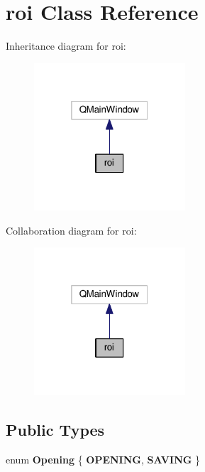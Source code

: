 \hypertarget{classroi}{}\section{roi Class Reference}
\label{classroi}


Inheritance diagram for roi\+:\nopagebreak
\begin{figure}[H]
\begin{center}
\leavevmode
\includegraphics[width=160pt]{classroi__inherit__graph}
\end{center}
\end{figure}


Collaboration diagram for roi\+:\nopagebreak
\begin{figure}[H]
\begin{center}
\leavevmode
\includegraphics[width=160pt]{classroi__coll__graph}
\end{center}
\end{figure}
\subsection*{Public Types}
\begin{DoxyCompactItemize}
\item 
enum {\bfseries Opening} \{ {\bfseries O\+P\+E\+N\+I\+NG}, 
{\bfseries S\+A\+V\+I\+NG}
 \}\hypertarget{classroi_a11ba253005bcf73bc0de2e9dddf66925}{}\label{classroi_a11ba253005bcf73bc0de2e9dddf66925}

\end{DoxyCompactItemize}
